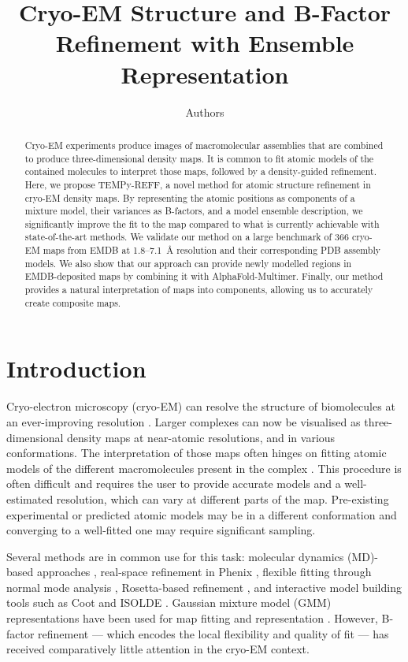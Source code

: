 \documentclass[11pt]{article}
\title{Cryo-EM Structure and B-Factor Refinement with Ensemble Representation}
\author[1]{Authors}
\affil[1]{Bijvoet Center for Biomolecular Research, Faculty of Science -- Chemistry, Utrecht University, Utrecht, The Netherlands}
\date{}
\begin{document}
\maketitle

\begin{abstract}
Cryo-EM experiments produce images of macromolecular assemblies that are combined to produce three-dimensional density maps. It is common to fit atomic models of the contained molecules to interpret those maps, followed by a density-guided refinement. Here, we propose TEMPy-REFF, a novel method for atomic structure refinement in cryo-EM density maps. By representing the atomic positions as components of a mixture model, their variances as B-factors, and a model ensemble description, we significantly improve the fit to the map compared to what is currently achievable with state-of-the-art methods. We validate our method on a large benchmark of 366 cryo-EM maps from EMDB at 1.8--7.1~\AA{} resolution and their corresponding PDB assembly models. We also show that our approach can provide newly modelled regions in EMDB-deposited maps by combining it with AlphaFold-Multimer. Finally, our method provides a natural interpretation of maps into components, allowing us to accurately create composite maps.
\end{abstract}

\section{Introduction}

Cryo-electron microscopy (cryo-EM) can resolve the structure of biomolecules at an ever-improving resolution \citep{nakane2018}. Larger complexes can now be visualised as three-dimensional density maps at near-atomic resolutions, and in various conformations. The interpretation of those maps often hinges on fitting atomic models of the different macromolecules present in the complex \citep{joseph2017,miyashita2012,topf2008}. This procedure is often difficult and requires the user to provide accurate models and a well-estimated resolution, which can vary at different parts of the map. Pre-existing experimental or predicted atomic models may be in a different conformation and converging to a well-fitted one may require significant sampling.

Several methods are in common use for this task: molecular dynamics (MD)-based approaches \citep{igaev2019,hoffmann2015}, real-space refinement in Phenix \citep{afonine2018,liebschner2019}, flexible fitting through normal mode analysis \citep{lopez2013,tama2004}, Rosetta-based refinement \citep{dimaio2016}, and interactive model building tools such as Coot \citep{emsley2010} and ISOLDE \citep{croll2018}. Gaussian mixture model (GMM) representations have been used for map fitting and representation \citep{kawabata2008,kawabata2018}. However, B-factor refinement --- which encodes the local flexibility and quality of fit --- has received comparatively little attention in the cryo-EM context.
\end{document}
